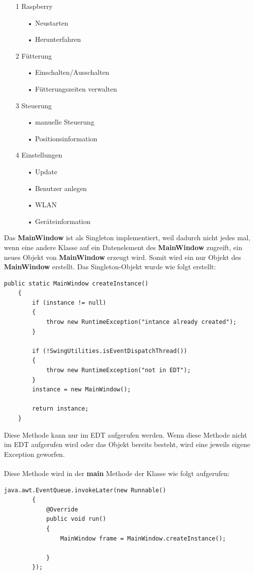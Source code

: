 \begin{itemize}
\item[1] Raspberry
\begin{itemize}
\item[•] Neustarten
\item[•] Herunterfahren
\end{itemize}
\item[2] Fütterung
\begin{itemize}
\item[•] Einschalten/Ausschalten
\item[•] Fütterungszeiten verwalten
\end{itemize}
\item[3] Steuerung
\begin{itemize}
\item[•] manuelle Steuerung
\item[•] Positionsinformation
\end{itemize}
\item[4] Einstellungen
\begin{itemize}
\item[•] Update
\item[•] Benutzer anlegen
\item[•] WLAN
\item[•] Geräteinformation
\end{itemize}
\end{itemize}

\vspace{10pt}

Das \textbf{MainWindow} ist als Singleton implementiert, weil dadurch nicht jedes mal, wenn eine andere Klasse auf ein Datenelement des \textbf{MainWindow} zugreift, ein neues Objekt von \textbf{MainWindow} erzeugt wird. Somit wird ein nur Objekt des \textbf{MainWindow} erstellt. Das Singleton-Objekt wurde wie folgt erstellt:
\begin{lstlisting}[style=JavaStyle, caption=MainWindow createInstance()]
public static MainWindow createInstance()
    {
        if (instance != null)
        {
            throw new RuntimeException("intance already created");
        }

        if (!SwingUtilities.isEventDispatchThread())
        {
            throw new RuntimeException("not in EDT");
        }
        instance = new MainWindow();

        return instance;
    }
\end{lstlisting}
Diese Methode kann nur im \ac{EDT} aufgerufen werden. Wenn diese Methode nicht im \ac{EDT} aufgerufen wird oder das Objekt bereits besteht, wird eine jeweils eigene Exception geworfen.
\\ \\ Diese Methode wird in der \textbf{main} Methode der Klasse wie folgt aufgerufen:
\begin{lstlisting}[style=JavaStyle, caption=MainWindow createInstance() Aufruf]
	java.awt.EventQueue.invokeLater(new Runnable()
        {
            @Override
            public void run()
            {
                MainWindow frame = MainWindow.createInstance();

            }
        });
\end{lstlisting}

